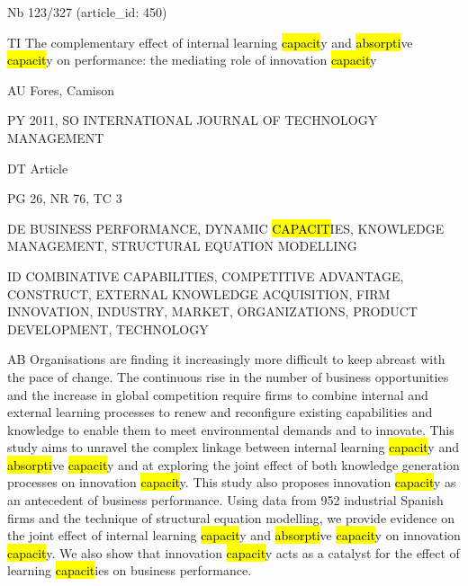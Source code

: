 \documentclass[a4paper]{article}
\begin{document}
\vspace*{-2cm}
Nb \tabto{0cm}123/327 (article\_id: 450)\par
TI \tabto{0cm}The complementary effect of internal learning \hl{capacit}y and \hl{absorpti}ve \hl{capacit}y on performance: the mediating role of innovation \hl{capacit}y\par
AU \tabto{0cm}Fores, Camison\par
PY \tabto{0cm}2011, SO INTERNATIONAL JOURNAL OF TECHNOLOGY MANAGEMENT\par
DT \tabto{0cm}Article\par
PG \tabto{0cm}26, NR 76, TC 3\par
DE \tabto{0cm}BUSINESS PERFORMANCE, DYNAMIC \hl{CAPACIT}IES, KNOWLEDGE MANAGEMENT, STRUCTURAL EQUATION MODELLING\par
ID \tabto{0cm}COMBINATIVE CAPABILITIES, COMPETITIVE ADVANTAGE, CONSTRUCT, EXTERNAL KNOWLEDGE ACQUISITION, FIRM INNOVATION, INDUSTRY, MARKET, ORGANIZATIONS, PRODUCT DEVELOPMENT, TECHNOLOGY\par
AB \tabto{0cm}Organisations are finding it increasingly more difficult to keep abreast with the pace of change. The continuous rise in the number of business opportunities and the increase in global competition require firms to combine internal and external learning processes to renew and reconfigure existing capabilities and knowledge to enable them to meet environmental demands and to innovate. This study aims to unravel the complex linkage between internal learning \hl{capacit}y and \hl{absorpti}ve \hl{capacit}y and at exploring the joint effect of both knowledge generation processes on innovation \hl{capacit}y. This study also proposes innovation \hl{capacit}y as an antecedent of business performance. Using data from 952 industrial Spanish firms and the technique of structural equation modelling, we provide evidence on the joint effect of internal learning \hl{capacit}y and \hl{absorpti}ve \hl{capacit}y on innovation \hl{capacit}y. We also show that innovation \hl{capacit}y acts as a catalyst for the effect of learning \hl{capacit}ies on business performance.\par
\clearpage
\end{document}
